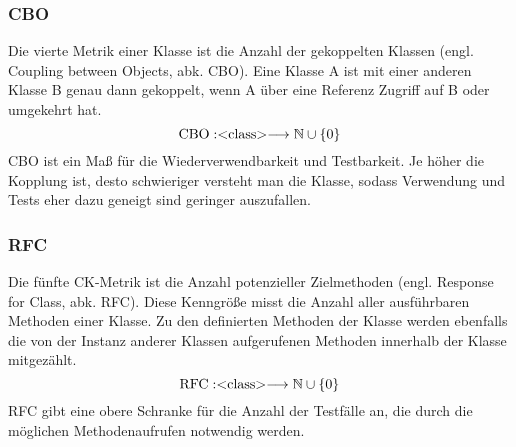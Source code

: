 \documentclass[12pt]{article}
\newcommand{\type}[1]{<\negthickspace\text{#1}\negthickspace> }
\begin{document}

\subsubsection{CBO}

Die vierte Metrik einer Klasse ist die Anzahl der gekoppelten
Klassen (engl. Coupling between Objects, abk. CBO). Eine Klasse A
ist mit einer anderen Klasse B genau dann gekoppelt, wenn A über
eine Referenz Zugriff auf B oder umgekehrt hat.
\[
        \text{CBO}: \type{class}
        \longrightarrow \mathbb{N} \cup \left\{ 0 \right\} 
\]
CBO ist ein Maß für die Wiederverwendbarkeit und Testbarkeit. Je
höher die Kopplung ist, desto schwieriger versteht man die Klasse,
sodass Verwendung und Tests eher dazu geneigt sind geringer auszufallen. 



\subsubsection{RFC}

Die fünfte CK-Metrik ist die Anzahl potenzieller Zielmethoden (engl. Response
for Class, abk. RFC). Diese Kenngröße misst die Anzahl aller
ausführbaren Methoden einer Klasse. Zu den definierten Methoden
der Klasse werden ebenfalls die von der Instanz anderer Klassen
aufgerufenen Methoden innerhalb der Klasse mitgezählt.
\[
        \text{RFC}: \type{class}
        \longrightarrow \mathbb{N} \cup \left\{ 0 \right\} 
\]
RFC gibt eine obere Schranke für die Anzahl der Testfälle an, die
durch die möglichen Methodenaufrufen notwendig werden.
\end{document}
